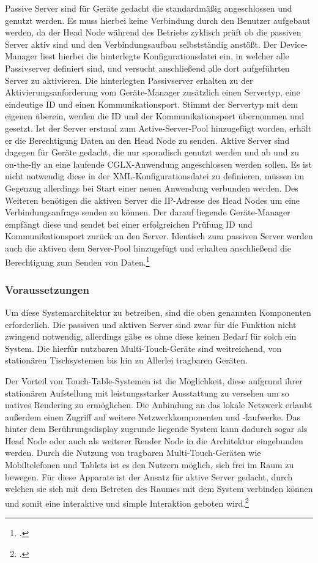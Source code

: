 Passive Server sind für Geräte gedacht die standardmäßig angeschlossen und genutzt werden. Es muss hierbei keine Verbindung durch den Benutzer aufgebaut werden, da der Head Node während des Betriebs zyklisch prüft ob die passiven Server aktiv sind und den Verbindungsaufbau selbstständig anstößt. Der Device-Manager liest hierbei die hinterlegte Konfigurationsdatei ein, in welcher alle Passivserver definiert sind, und versucht anschließend alle dort aufgeführten Server zu aktivieren. Die hinterlegten Passivserver erhalten zu der Aktivierungsanforderung vom Geräte-Manager zusätzlich einen Servertyp, eine eindeutige ID und einen Kommunikationsport. Stimmt der Servertyp mit dem eigenen überein, werden die ID und der Kommunikationsport übernommen und gesetzt. Ist der Server erstmal zum Active-Server-Pool hinzugefügt worden, erhält er die Berechtigung Daten an den Head Node zu senden.
Aktive Server sind dagegen für Geräte gedacht, die nur sporadisch genutzt werden und ab und zu on-the-fly an eine laufende CGLX-Anwendung angeschlossen werden sollen. Es ist nicht notwendig diese in der XML-Konfigurationsdatei zu definieren, müssen im Gegenzug allerdings bei Start einer neuen Anwendung verbunden werden. Des Weiteren benötigen die aktiven Server die IP-Adresse des Head Nodes um eine Verbindungsanfrage senden zu können. Der darauf liegende Geräte-Manager empfängt diese und sendet bei einer erfolgreichen Prüfung ID und Kommunikationsport zurück an den Server. Identisch zum passiven Server werden auch die aktiven dem Server-Pool hinzugefügt und erhalten anschließend die Berechtigung zum Senden von Daten.\footcite[Vgl.][Seite 651 f.]{Table}

\subsubsection{Voraussetzungen}
Um diese Systemarchitektur zu betreiben, sind die oben genannten Komponenten erforderlich. Die passiven und aktiven Server sind zwar für die Funktion nicht zwingend notwendig, allerdings gäbe es ohne diese keinen Bedarf für solch ein System. Die hierfür nutzbaren Multi-Touch-Geräte sind weitreichend, von stationären Tischsystemen bis hin zu Allerlei tragbaren Geräten.

Der Vorteil von Touch-Table-Systemen ist die Möglichkeit, diese aufgrund ihrer stationären Aufstellung mit leistungsstarker Ausstattung zu versehen um so natives Rendering zu ermöglichen. Die Anbindung an das lokale Netzwerk erlaubt außerdem einen Zugriff auf weitere Netzwerkkomponenten und -laufwerke. Das hinter dem Berührungsdisplay zugrunde liegende System kann dadurch sogar als Head Node oder auch als weiterer Render Node in die Architektur eingebunden werden. 
Durch die Nutzung von tragbaren Multi-Touch-Geräten wie Mobiltelefonen und Tablets ist es den Nutzern möglich, sich frei im Raum zu bewegen. Für diese Apparate ist der Ansatz für aktive Server gedacht, durch welchen sie sich mit dem Betreten des Raumes mit dem System verbinden können und somit eine interaktive und simple Interaktion geboten wird.\footcite[Vgl.][Seite 652]{Table}

